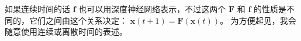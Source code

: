 \documentclass[orivec]{llncs}
\makeatletter
\newcommand{\vect}[1]{\boldsymbol{#1}}
\renewcommand{\boxed}[1]{\fbox{\m@th$\displaystyle\scalebox{0.9}{#1}$} \,}
\makeatother
\begin{document}
如果连续时间的话 $\vect{f}$ 也可以用深度神经网络表示，不过这两个 $\vect{F}$ 和 $\vect{f}$ 的性质是不同的，它们之间由这个关系决定： $\vect{x}(t + 1) = \vect{F}(\vect{x}(t))$。 为方便起见，我会随意使用连续或离散时间的表述。





\end{document}
